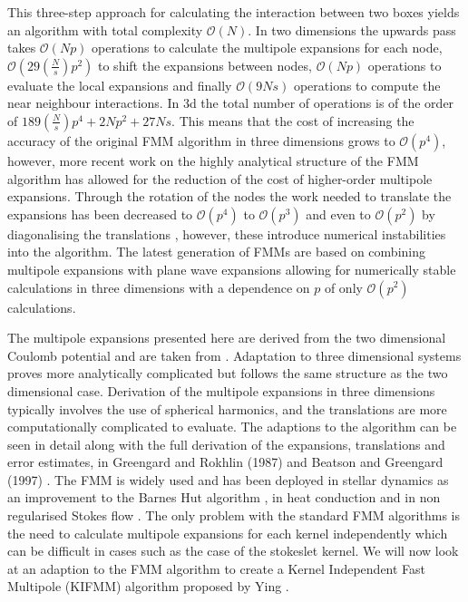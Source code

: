 This three-step approach for calculating the interaction between two boxes yields an algorithm with total complexity $\mathcal{O}(N)$. In two dimensions the upwards pass takes $\mathcal{O}(Np)$ operations to calculate the multipole expansions for each node, $\mathcal{O}(29 \left(\frac{N}{s}\right) p^2)$ to shift the expansions between nodes, $\mathcal{O}(Np)$ operations to evaluate the local expansions and finally $\mathcal{O}(9Ns)$ operations to compute the near neighbour interactions. In 3d the total number of operations is of the order of $189\left(\frac{N}{s}\right)p^4 + 2Np^2 + 27Ns$. This means that the cost of increasing the accuracy of the original FMM algorithm in three dimensions grows to $\mathcal{O}(p^4)$, however, more recent work on the highly analytical structure of the FMM algorithm has allowed for the reduction of the cost of higher-order multipole expansions. Through the rotation of the nodes the work needed to translate the expansions has been decreased to $\mathcal{O}(p^4)$ to $\mathcal{O}(p^3)$ \cite{Greengard1997ADimensions,Hrycak1998AnFields} and even to $\mathcal{O}(p^2)$ by diagonalising the translations \cite{Berman2006Grid-MultipoleCalculations,Elliott1996FastAlgorithm}, however, these introduce numerical instabilities into the algorithm. The latest generation of FMMs are based on combining multipole expansions with plane wave expansions \cite{Greengard1997ADimensions,Hrycak1998AnFields} allowing for numerically stable calculations in three dimensions with a dependence on $p$ of only $\mathcal{O}(p^2)$ calculations. 

The multipole expansions presented here are derived from the two dimensional Coulomb potential and are taken from \cite{Beatson,Greengard1987ASimulations}. Adaptation to three dimensional systems proves more analytically complicated but follows the same structure as the two dimensional case. Derivation of the multipole expansions in three dimensions typically involves the use of spherical harmonics, and the translations are more computationally complicated to evaluate. The adaptions to the algorithm can be seen in detail along with the full derivation of the expansions, translations and error estimates, in Greengard and Rokhlin (1987) \cite{Greengard1987ASimulations} and Beatson and Greengard (1997) \cite{Beatson}. The FMM is widely used and has been deployed in stellar dynamics as an improvement to the Barnes Hut algorithm \cite{Dehnen2014ADynamics}, in heat conduction \cite{Watschinger2021AEquation} and in non regularised Stokes flow \cite{Selmi2007FastComplexity,Tornberg2008}. The only problem with the standard FMM algorithms is the need to calculate multipole expansions for each kernel independently which can be difficult in cases such as the case of the stokeslet kernel. We will now look at an adaption to the FMM algorithm to create a Kernel Independent Fast Multipole (KIFMM) algorithm proposed by Ying \cite{Ying2004,Ying2005}.